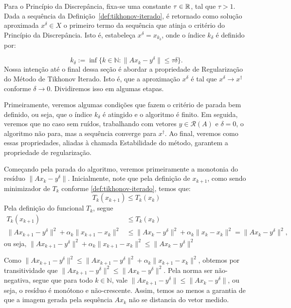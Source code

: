 Para o Princípio da Discrepância, fixa-se uma constante $\tau \in \mathbb{R}$, tal que $\tau>1$. Dada a sequência da Definição~\ref{def:tikhonov-iterado}, é retornado como solução aproximada $x^\delta \in X$ o primeiro termo da sequência que atinja o critério do Princípio da Discrepância. Isto é, estabeleça $x^\delta = x_{k_\delta}$, onde o índice $k_\delta$ é definido por:

\begin{equation}\label{eq:discrepancia-tikhonov}
    k_\delta := \inf\{k \in \mathbb N : \| Ax_k - y^\delta\|\leq \tau \delta \}.
\end{equation}
Nossa intenção até o final dessa seção é abordar a propriedade de Regularização do Método de Tikhonov Iterado. Isto é, que a aproximação $x^\delta$ é tal que $x^\delta \to x^\dag$ conforme $\delta \to 0$.  Dividiremos isso em algumas etapas.

Primeiramente, veremos algumas condições que fazem o critério de parada bem definido, ou seja, que o índice $k_\delta$ é atingido e o algoritmo é finito. Em seguida, veremos que no caso sem ruídos, trabalhando com vetores $y \in \mathcal R(A)$ e $\delta=0$, o algoritmo não para, mas a sequência converge para $x^\dag$. Ao final, veremos como essas propriedades, aliadas à chamada Estabilidade do método, garantem a propriedade de regularização.

Começando pela parada do algoritmo, veremos primeiramente a monotonia do resíduo $\| Ax_k - y^\delta \|$. Inicialmente, note que pela definição de $x_{k+1}$, como sendo minimizador de $T_k$ conforme \eqref{def:tikhonov-iterado}, temos que:
\begin{equation*}
    T_k(x_{k+1}) \leq T_k (x_k)
\end{equation*}
Pela definição do funcional $T_k$, segue
\begin{align*}
    T_k(x_{k+1}) &\leq T_k (x_k) \\
    \| Ax_{k+1} - y^\delta \|^2 + \alpha_k \|x_{k+1} - x_k \|^2 &\leq \| Ax_{k} - y^\delta \|^2 + \alpha_k \|x_{k} - x_k \|^2 = \| Ax_{k} - y^\delta\|^2,
\end{align*}
ou seja, $\| Ax_{k+1} - y^\delta \|^2 + \alpha_k \|x_{k+1} - x_k \|^2 \leq \| Ax_{k} - y^\delta\|^2$

Como $\| Ax_{k+1} - y^\delta\|^2 \leq \| Ax_{k+1} - y^\delta\|^2 + \alpha_k \|x_{k+1} - x_k \|^2$, obtemos por transitividade que $\| Ax_{k+1} - y^\delta\|^2 \leq \| Ax_{k} - y^\delta\|^2$. Pela norma ser não-negativa, segue que para todo $k \in \mathbb N$, vale $\| Ax_{k+1} - y^\delta\| \leq \| Ax_{k} - y^\delta\|$, ou seja, o resíduo é monótono e não-crescente. Assim, temos ao menos a garantia de que a imagem gerada pela sequência $Ax_k$ não se distancia do vetor medido. 

